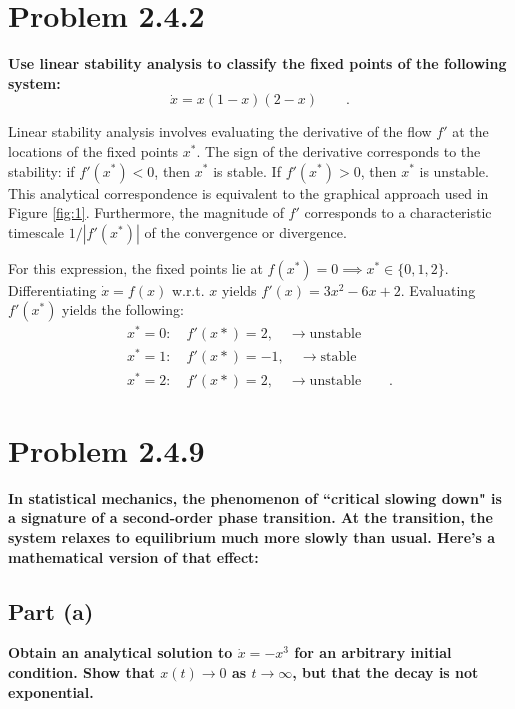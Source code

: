 \documentclass[draft]{agujournal2019}
\begin{document}
\newpage


\section{Problem 2.4.2}
\label{sec:p4}
\textbf{Use linear stability analysis to classify the fixed points of the following system:}
\begin{equation*}
    \dot x = x(1-x)(2-x) \qquad .
\end{equation*}

Linear stability analysis involves evaluating the derivative of the flow $f'$ at the locations of the fixed points $x^*$. The sign of the derivative corresponds to the stability: if $f'(x^*)<0$, then $x^*$ is stable. If $f'(x^*)>0$, then $x^*$ is unstable. This analytical correspondence is equivalent to the graphical approach used in Figure \ref{fig:1}. Furthermore, the magnitude of $f'$ corresponds to a characteristic timescale $1/{|f'(x^*)|}$ of the convergence or divergence. 
\par

For this expression, the fixed points lie at $f(x^*)=0 \implies x^*\in\{0,1,2\}$. Differentiating $\dot x = f(x)$ w.r.t. $x$ yields $f'(x)=3x^2 - 6x + 2$. Evaluating $f'(x^*)$ yields the following:
\begin{align}
    x^* = 0: \quad f'(x*) = 2, \quad\longrightarrow \mathrm{unstable} \\
    x^* = 1: \quad f'(x*) = -1, \quad\longrightarrow \mathrm{stable} \\
    x^* = 2: \quad f'(x*) = 2, \quad\longrightarrow \mathrm{unstable} \qquad .
\end{align}

\newpage


\section{Problem 2.4.9}
\label{sec:p5}
\textbf{In statistical mechanics, the phenomenon of ``critical slowing down" is a signature of a second-order phase transition. At the transition, the system relaxes to equilibrium much more slowly than usual. Here's a mathematical version of that effect:}

\subsection{Part (a)}
\label{subsec:p5a}
\textbf{Obtain an analytical solution to $\dot x = -x^3$ for an arbitrary initial condition. Show that $x(t)\longrightarrow0$ as $t\longrightarrow\infty$, but that the decay is not exponential. }
\end{document}
